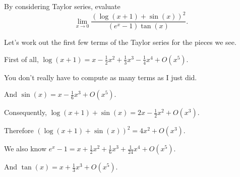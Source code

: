 \documentclass{ximera}
\begin{document}

            \begin{question}
              By considering Taylor series, evaluate \[\lim_{x \to 0} \displaystyle\frac{ {\left(\log\left(x + 1\right) + \sin\left(x\right)\right)}^{2} }{ {\left(e^{x} - 1\right)} \tan\left(x\right)}.\]

              \begin{solution}
                \begin{hint}
                  Let's work out the first few terms of the Taylor series for the pieces we see.
                \end{hint}
                \begin{hint}
                  First of all, \(\log\left(x + 1\right) = x - \displaystyle\frac{1}{2}x^{2} + \displaystyle\frac{1}{3}x^{3} - \displaystyle\frac{1}{4}x^{4} + O(x^{5})\).
                \end{hint}
                \begin{hint}
                  You don't really have to compute as many terms as I just did.
                \end{hint}
                \begin{hint}
                  And \(\sin\left(x\right) = x - \displaystyle\frac{1}{6}x^{3} + O(x^{5})\).
                \end{hint}
                \begin{hint}
                  Consequently, \(\log\left(x + 1\right) + \sin\left(x\right) = 2x - \displaystyle\frac{1}{2}x^{2} + O(x^{3})\).
                \end{hint}
                \begin{hint}
                  Therefore \(\left(\log\left(x + 1\right) + \sin\left(x\right)\right)^2 = 4x^{2} + O(x^{3})\).
                \end{hint}
                \begin{hint}
                  We also know \(e^{x} - 1 = x + \displaystyle\frac{1}{2}x^{2} + \displaystyle\frac{1}{6}x^{3} + \displaystyle\frac{1}{24}x^{4} + O(x^{5})\).
                \end{hint}
                \begin{hint}
                  And \(\tan\left(x\right) = x + \displaystyle\frac{1}{3}x^{3} + O(x^{5})\).
                \end{hint}
                \begin{hint}

\end{hint}
\end{solution}
\end{question}
\end{document}
